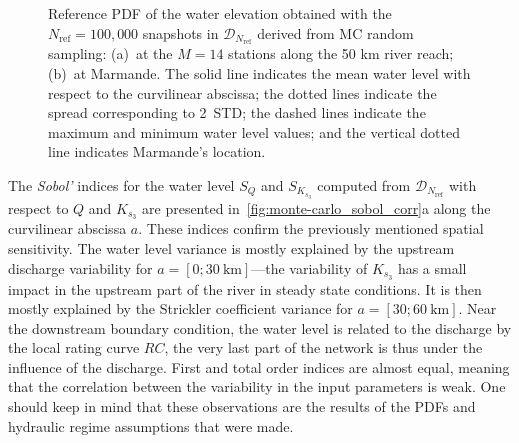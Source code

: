 \begin{figure}[!ht]               
\centering
{} 
\caption{Reference PDF of the water elevation obtained with the $N_{\text{ref}} = 100,000$ snapshots in $\mathcal{D}_{N_{\text{ref}}}$ derived from MC random sampling: (a)~at the $M = 14$ stations along the 50 km river reach; (b)~at Marmande. The solid line indicates the mean water level with respect to the curvilinear abscissa; the dotted lines indicate the spread corresponding to 2~STD; the dashed lines indicate the maximum and minimum water level values; and the vertical dotted line indicates Marmande's location.}
\label{fig:monte-carlo_pdf}
\end{figure}

The \emph{Sobol'} indices for the water level $S_Q$ and $S_{K_{s_3}}$ computed from $\mathcal{D}_{N_{\text{ref}}}$ with respect to $Q$ and $K_{s_3}$ are presented in~\cref{fig:monte-carlo_sobol_corr}a along the curvilinear abscissa $a$. These indices confirm the previously mentioned spatial sensitivity. The water level variance is mostly explained by the upstream discharge variability for $a = [0; 30~\text{km}]$---the variability of $K_{s_3}$ has a small impact in the upstream part of the river in steady state conditions. It is then mostly explained by the Strickler coefficient variance for $a = [30; 60~\text{km}]$. Near the downstream boundary condition, the water level is related to the discharge by the local rating curve $RC$, the very last part of the network is thus under the influence of the discharge. First and total order indices are almost equal, meaning that the correlation between the variability in the input parameters is weak. One should keep in mind that these observations are the results of the PDFs and hydraulic regime assumptions that were made.

